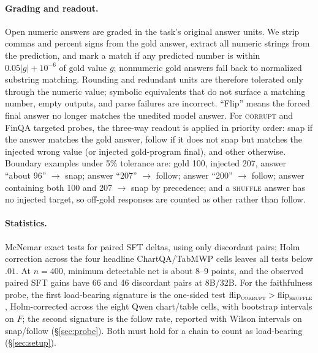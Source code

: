 \documentclass[11pt]{article}
\newcommand{\corrupt}{\textsc{corrupt}}
\newcommand{\shuffle}{\textsc{shuffle}}
\begin{document}
\paragraph{Grading and readout.}
Open numeric answers are graded in the task's original answer units. We strip commas and percent signs from the gold answer, extract all numeric strings from the prediction, and mark a match if any predicted number is within $0.05|g|+10^{-6}$ of gold value $g$; nonnumeric gold answers fall back to normalized substring matching. Rounding and redundant units are therefore tolerated only through the numeric value; symbolic equivalents that do not surface a matching number, empty outputs, and parse failures are incorrect. ``Flip'' means the forced final answer no longer matches the unedited model answer. For \corrupt{} and FinQA targeted probes, the three-way readout is applied in priority order: snap if the answer matches the gold answer, follow if it does not snap but matches the injected wrong value (or injected gold-program final), and other otherwise. Boundary examples under 5\% tolerance are: gold 100, injected 207, answer ``about 96'' $\rightarrow$ snap; answer ``207'' $\rightarrow$ follow; answer ``200'' $\rightarrow$ follow; answer containing both 100 and 207 $\rightarrow$ snap by precedence; and a \shuffle{} answer has no injected target, so off-gold responses are counted as other rather than follow.

\paragraph{Statistics.}
McNemar exact tests for paired SFT deltas, using only discordant pairs; Holm correction across the four headline ChartQA/TabMWP cells leaves all tests below $.01$. At $n{=}400$, minimum detectable net is about 8--9 points, and the observed paired SFT gains have 66 and 46 discordant pairs at 8B/32B. For the faithfulness probe, the first load-bearing signature is the one-sided test $\text{flip}_{\corrupt}>\text{flip}_{\shuffle}$, Holm-corrected across the eight Qwen chart/table cells, with bootstrap intervals on $F$; the second signature is the follow rate, reported with Wilson intervals on snap/follow (\S\ref{sec:probe}). Both must hold for a chain to count as load-bearing (\S\ref{sec:setup}).
\end{document}
